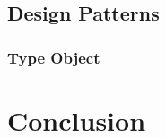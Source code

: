 \documentclass[pdf]{beamer}
\begin{document}
\subsection{Design Patterns}

\begin{frame}
  \frametitle{Type Object}
  \begin{tikzpicture}
    
  \end{tikzpicture}
\end{frame}


\section{Conclusion}
\end{document}
